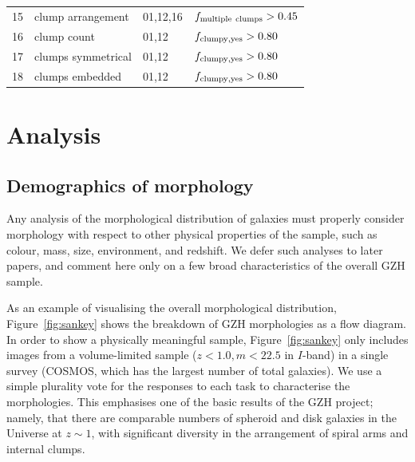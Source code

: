 \documentclass[a4paper,fleqn,usenatbib]{mnras}
\begin{document}
\begin{table}
\begin{tabular}{llll}
15       & clump arrangement    & 01,12,16         & $f_{\rm multiple~clumps}>0.45$     \\
16       & clump count          & 01,12            & $f_{\rm clumpy,yes}>0.80$          \\
17       & clumps symmetrical   & 01,12            & $f_{\rm clumpy,yes}>0.80$          \\
18       & clumps embedded      & 01,12            & $f_{\rm clumpy,yes}>0.80$          \\
\hline\hline
\end{tabular}
\end{table}

\section{Analysis}\label{sec:analysis}


\subsection{Demographics of morphology}

Any analysis of the morphological distribution of galaxies must properly
consider morphology with respect to other physical properties of the sample,
such as colour, mass, size, environment, and redshift. We defer such analyses to
later papers, and comment here only on a few broad characteristics of the
overall GZH sample. 

As an example of visualising the overall morphological distribution,
Figure~\ref{fig:sankey} shows the breakdown of GZH morphologies as a flow
diagram. In order to show a physically meaningful sample,
Figure~\ref{fig:sankey} only includes images from a volume-limited sample
($z<1.0, m<22.5$ in $I$-band) in a single \hst{} survey (COSMOS, which has the
largest number of total galaxies).  We use a simple plurality vote for the
responses to each task to characterise the morphologies.  This emphasises one
of the basic results of the GZH project; namely, that there are comparable
numbers of spheroid and disk galaxies in the Universe at $z\sim1$, with
significant diversity in the arrangement of spiral arms and internal clumps.
\end{document}
